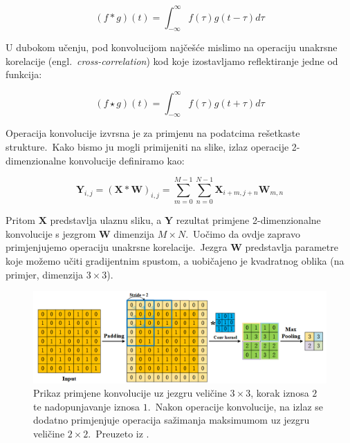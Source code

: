 \documentclass[diplomskirad]{fer}
\begin{document}
\begin{equation}
  (f * g)(t) = \int_{-\infty}^{\infty} f(\tau) g(t - \tau) d\tau
  \label{eq:conv_original}
\end{equation}

\pagebreak

U dubokom učenju, pod konvolucijom najčešće mislimo na operaciju unakrsne korelacije (engl.\ \textit{cross-correlation}) kod koje izostavljamo reflektiranje jedne od funkcija:

\begin{equation}
  (f \star g)(t) = \int_{-\infty}^{\infty} f(\tau) g(t + \tau) d\tau
  \label{eq:cross_corel}
\end{equation}

Operacija konvolucije izvrsna je za primjenu na podatcima rešetkaste strukture.\ Kako bismo ju mogli primijeniti na slike, izlaz operacije 2-dimenzionalne konvolucije definiramo kao:

\begin{equation}
  \bm{Y}_{i,j} = (\bm{X} * \bm{W})_{i,j} = \sum_{m=0}^{M-1} \sum_{n=0}^{N-1} \bm{X}_{i+m,j+n} \bm{W}_{m,n}
  \label{eq:conv_2d}
\end{equation}

Pritom $\bm{X}$ predstavlja ulaznu sliku, a $\bm{Y}$ rezultat primjene 2-dimenzionalne konvolucije s jezgrom $\bm{W}$ dimenzija $M \times N$.\ Uočimo da ovdje zapravo primjenjujemo operaciju unakrsne korelacije.\
Jezgra $\bm{W}$ predstavlja parametre koje možemo učiti gradijentnim spustom, a uobičajeno je kvadratnog oblika (na primjer, dimenzija $3 \times 3$).\ 

\begin{figure}[h]
  \centering
  \includegraphics[scale=0.75]{./Slike/conv.png}
  \caption{Prikaz primjene konvolucije uz jezgru veličine $3 \times 3$, korak iznosa $2$ te nadopunjavanje iznosa $1$.\ Nakon operacije konvolucije, na izlaz se dodatno primjenjuje operacija sažimanja maksimumom uz jezgru veličine $2 \times 2$.\ Preuzeto iz \cite{li2021survey}.}
  \label{fig:conv}
\end{figure}
\end{document}
